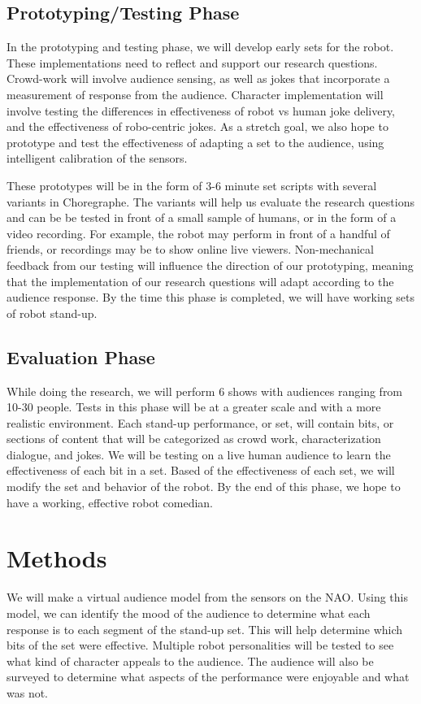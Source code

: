 \documentclass[onecolumn, draftclsnofoot,10pt, compsoc]{IEEEtran}
\begin{document}
\subsection{Prototyping/Testing Phase}
In the prototyping and testing phase, we will develop early sets for the robot. These implementations need to reflect and support our research questions. Crowd-work will involve audience sensing, as well as jokes that incorporate a measurement of response from the audience. Character implementation will involve testing the differences in effectiveness of robot vs human joke delivery, and the effectiveness of robo-centric jokes. As a stretch goal, we also hope to prototype and test the effectiveness of adapting a set to the audience, using intelligent calibration of the sensors.

These prototypes will be in the form of 3-6 minute set scripts with several variants in Choregraphe. The variants will help us evaluate the research questions and can be be tested in front of a small sample of humans, or in the form of a video recording. For example, the robot may perform in front of a handful of friends, or recordings may be to show online live viewers. Non-mechanical feedback from our testing will influence the direction of our prototyping, meaning that the implementation of our research questions will adapt according to the audience response. By the time this phase is completed, we will have working sets of robot stand-up.

\subsection{Evaluation Phase}
While doing the research, we will perform 6 shows with audiences ranging from 10-30 people. Tests in this phase will be at a greater scale and with a more realistic environment. Each stand-up performance, or set, will contain bits, or sections of content that will be categorized as crowd work, characterization dialogue, and jokes. We will be testing on a live human audience to learn the effectiveness of each bit in a set. Based of the effectiveness of each set, we will modify the set and behavior of the robot. By the end of this phase, we hope to have a working, effective robot comedian.

\section{Methods}
We will make a virtual audience model from the sensors on the NAO. Using this model, we can identify the mood of the audience to determine what each response is to each segment of the stand-up set. This will help determine which bits of the set were effective. Multiple robot personalities will be tested to see what kind of character appeals to the audience. The audience will also be surveyed to determine what aspects of the performance were enjoyable and what was not.
\end{document}
